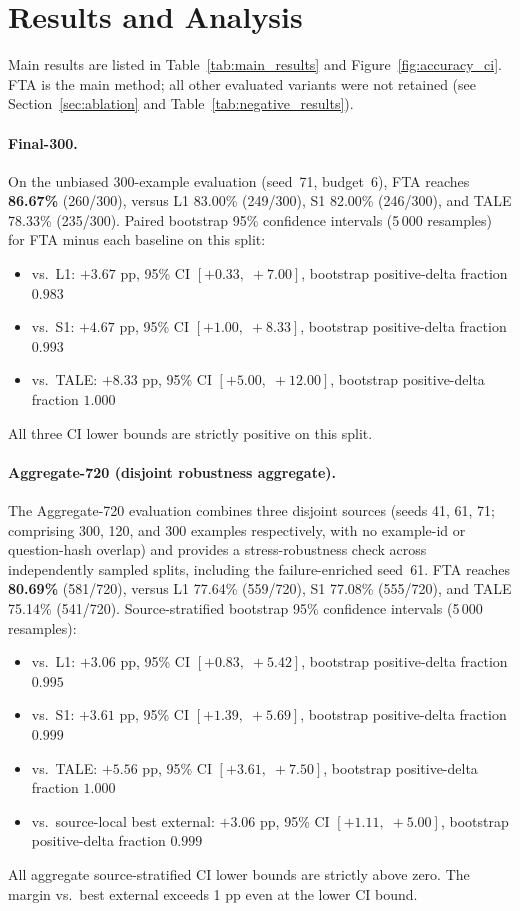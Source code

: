 \section{Results and Analysis}
\label{sec:results}

Main results are listed in Table~\ref{tab:main_results} and
Figure~\ref{fig:accuracy_ci}.
FTA is the main method; all other evaluated variants were not retained
(see Section~\ref{sec:ablation} and Table~\ref{tab:negative_results}).

\paragraph{Final-300.}
On the unbiased 300-example evaluation (seed~71, budget~6), FTA reaches
\textbf{86.67\%} (260/300), versus L1 83.00\% (249/300), S1 82.00\%
(246/300), and TALE 78.33\% (235/300).
Paired bootstrap 95\% confidence intervals (5\,000 resamples) for FTA
minus each baseline on this split:
\begin{itemize}[nosep,leftmargin=1.5em]
  \item vs.\ L1: $+3.67$ pp, 95\% CI $[+0.33,\;+7.00]$, bootstrap
        positive-delta fraction $0.983$
  \item vs.\ S1: $+4.67$ pp, 95\% CI $[+1.00,\;+8.33]$, bootstrap
        positive-delta fraction $0.993$
  \item vs.\ TALE: $+8.33$ pp, 95\% CI $[+5.00,\;+12.00]$, bootstrap
        positive-delta fraction $1.000$
\end{itemize}
All three CI lower bounds are strictly positive on this split.

\paragraph{Aggregate-720 (disjoint robustness aggregate).}
The Aggregate-720 evaluation combines three disjoint sources (seeds 41, 61, 71;
comprising 300, 120, and 300 examples respectively, with no example-id or
question-hash overlap) and provides a stress-robustness check across
independently sampled splits, including the failure-enriched seed~61.
FTA reaches \textbf{80.69\%} (581/720), versus L1 77.64\% (559/720),
S1 77.08\% (555/720), and TALE 75.14\% (541/720).
Source-stratified bootstrap 95\% confidence intervals (5\,000 resamples):
\begin{itemize}[nosep,leftmargin=1.5em]
  \item vs.\ L1: $+3.06$ pp, 95\% CI $[+0.83,\;+5.42]$, bootstrap
        positive-delta fraction $0.995$
  \item vs.\ S1: $+3.61$ pp, 95\% CI $[+1.39,\;+5.69]$, bootstrap
        positive-delta fraction $0.999$
  \item vs.\ TALE: $+5.56$ pp, 95\% CI $[+3.61,\;+7.50]$, bootstrap
        positive-delta fraction $1.000$
  \item vs.\ source-local best external: $+3.06$ pp, 95\% CI $[+1.11,\;+5.00]$,
        bootstrap positive-delta fraction $0.999$
\end{itemize}
All aggregate source-stratified CI lower bounds are strictly above zero.
The margin vs.\ best external exceeds 1 pp even at the lower CI bound.

